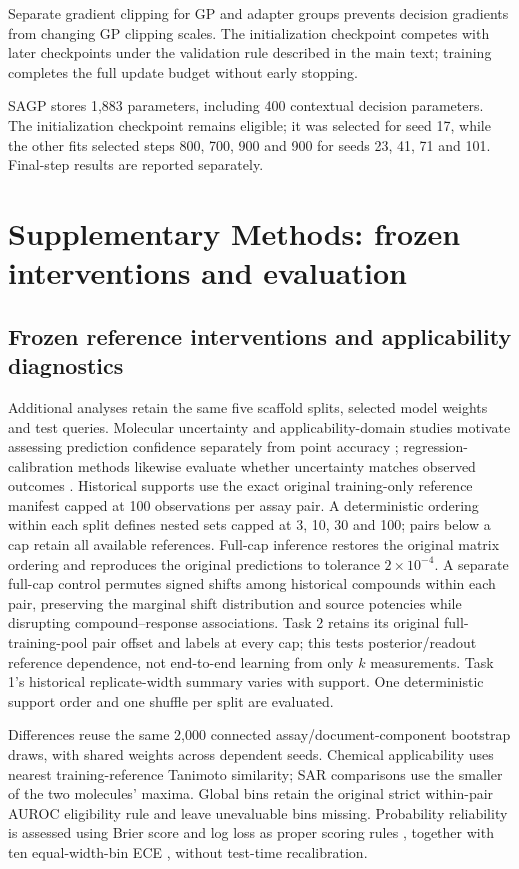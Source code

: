 \documentclass[letterpaper]{article}
\begin{document}
Separate gradient clipping for GP and adapter groups prevents decision gradients from changing GP clipping scales. The initialization checkpoint competes with later checkpoints under the validation rule described in the main text; training completes the full update budget without early stopping.

SAGP stores 1,883 parameters, including 400 contextual decision parameters. The initialization checkpoint remains eligible; it was selected for seed 17, while the other fits selected steps 800, 700, 900 and 900 for seeds 23, 41, 71 and 101. Final-step results are reported separately. 

\section{Supplementary Methods: frozen interventions and evaluation}

\subsection{Frozen reference interventions and applicability diagnostics}
Additional analyses retain the same five scaffold splits, selected model weights and test queries. Molecular uncertainty and applicability-domain studies motivate assessing prediction confidence separately from point accuracy \citep{scalia2020uncertainty,liu2019domain,norinder2014conformal}; regression-calibration methods likewise evaluate whether uncertainty matches observed outcomes \citep{kuleshov2018calibration}. Historical supports use the exact original training-only reference manifest capped at 100 observations per assay pair. A deterministic ordering within each split defines nested sets capped at 3, 10, 30 and 100; pairs below a cap retain all available references. Full-cap inference restores the original matrix ordering and reproduces the original predictions to tolerance $2\times10^{-4}$. A separate full-cap control permutes signed shifts among historical compounds within each pair, preserving the marginal shift distribution and source potencies while disrupting compound--response associations. Task 2 retains its original full-training-pool pair offset and labels at every cap; this tests posterior/readout reference dependence, not end-to-end learning from only $k$ measurements. Task 1's historical replicate-width summary varies with support. One deterministic support order and one shuffle per split are evaluated.

Differences reuse the same 2,000 connected assay/document-component bootstrap draws, with shared weights across dependent seeds. Chemical applicability uses nearest training-reference Tanimoto similarity; SAR comparisons use the smaller of the two molecules' maxima. Global bins retain the original strict within-pair AUROC eligibility rule and leave unevaluable bins missing. Probability reliability is assessed using Brier score and log loss as proper scoring rules \citep{gneiting2007scores}, together with ten equal-width-bin ECE \citep{guo2017calibration}, without test-time recalibration. 
\end{document}
